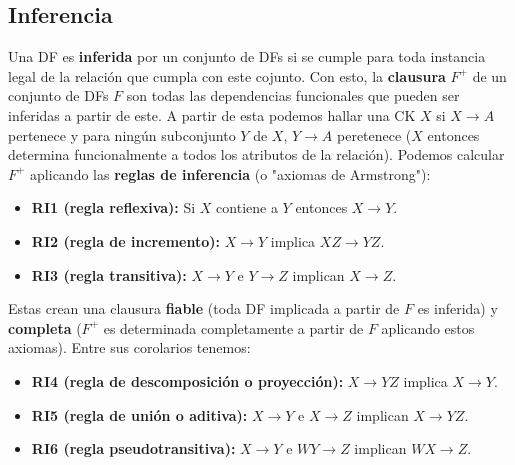 \subsection*{Inferencia}
Una DF es \textbf{inferida} por un conjunto de DFs si se cumple para toda instancia legal de la relación que cumpla con este cojunto. Con esto, la \textbf{clausura} $F^+$ de un conjunto de DFs $F$ son todas las dependencias funcionales que pueden ser inferidas a partir de este. A partir de esta podemos hallar una CK $X$ si $X \rightarrow A$ pertenece y para ningún subconjunto $Y$ de $X$, $Y \rightarrow A$ peretenece ($X$ entonces determina funcionalmente a todos los atributos de la relación).
Podemos calcular $F^+$ aplicando las \textbf{reglas de inferencia} (o "axiomas de Armstrong"):
\begin{itemize}
    \item \textbf{RI1 (regla reflexiva):} Si $X$ contiene a $Y$ entonces $X \rightarrow Y$.
    \item \textbf{RI2 (regla de incremento):} $X \rightarrow Y$ implica $XZ \rightarrow YZ$.
    \item \textbf{RI3 (regla transitiva):} $X \rightarrow Y$ e $Y \rightarrow Z$ implican $X \rightarrow Z$.
\end{itemize}
Estas crean una clausura \textbf{fiable} (toda DF implicada a partir de $F$ es inferida) y \textbf{completa} ($F^+$ es determinada completamente a partir de $F$ aplicando estos axiomas). Entre sus corolarios tenemos:
\begin{itemize}
    \item \textbf{RI4 (regla de descomposición o proyección):} $X \rightarrow YZ$ implica $X \rightarrow Y$.
    \item \textbf{RI5 (regla de unión o aditiva):} $X \rightarrow Y$ e $X \rightarrow Z$ implican $X \rightarrow YZ$.
    \item \textbf{RI6 (regla pseudotransitiva):} $X \rightarrow Y$ e $WY \rightarrow Z$ implican $WX \rightarrow Z$.
\end{itemize}
